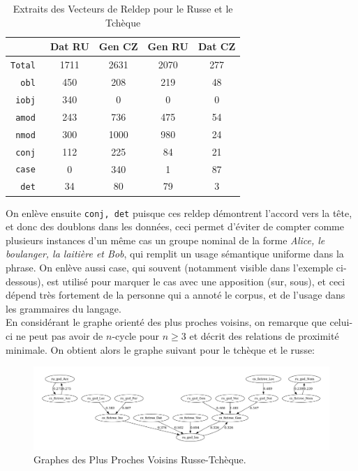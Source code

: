 \documentclass{cours}
\begin{document}
\begin{table}[H]
	\centering
	\begin{tabular}{>{\tt}r|cccc}
		\toprule
		&Dat RU & Gen CZ & Gen RU & Dat CZ\\
		\midrule
		Total & 1711 & 2631 & 2070 & 277\\
		obl & 450 & 208 & 219 & 48\\
		iobj & 340 & 0 & 0 & 0\\
		amod & 243 & 736 & 475 & 54\\
		nmod & 300 & 1000 & 980 & 24\\
		conj & 112 & 225 & 84 & 21\\
		case & 0 & 340 & 1 & 87\\
		det & 34 & 80 & 79 & 3\\
		\bottomrule
	\end{tabular}
	\caption{Extraits des Vecteurs de Reldep pour le Russe et le Tchèque}
\end{table}

On enlève ensuite \texttt{conj, det} puisque ces reldep démontrent l'accord vers la tête, et donc des doublons dans les données, ceci permet d'éviter de compter comme plusieurs instances d'un même cas un groupe nominal de la forme \emph{Alice, le boulanger, la laitière et Bob}, qui remplit un usage sémantique uniforme dans la phrase.
On enlève aussi case, qui souvent (notamment visible dans l'exemple ci-dessous), est utilisé pour marquer le cas avec une apposition (sur, sous), et ceci dépend très fortement de la personne qui a annoté le corpus, et de l'usage dans les grammaires du langage.\\
En considérant le graphe orienté des plus proches voisins, on remarque que celui-ci ne peut pas avoir de $n$-cycle pour $n \geq 3$ et décrit des relations de proximité minimale.
On obtient alors le graphe suivant pour le tchèque et le russe:

\begin{figure}[H]
	\centering
	\includegraphics[width=\textwidth]{Figures/GNN/gnn_ru_gsd_cs_fictree}
	\caption{Graphes des Plus Proches Voisins Russe-Tchèque.}
\end{figure}
\end{document}
